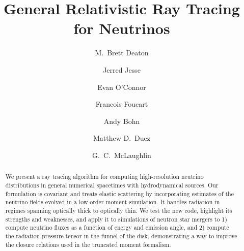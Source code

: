 \documentclass[aps,prd,twocolumn,superscriptaddress,groupedaddress]{revtex4}
\begin{document}
\widetext
{}

\title{General Relativistic Ray Tracing for Neutrinos}

\author{M.\ Brett Deaton}

\author{Jerred Jesse}

\author{Evan O'Connor}

\author{Francois Foucart}

\author{Andy Bohn}

\author{Matthew D.\ Duez}

\author{G.\ C.\ McLaughlin}


\begin{abstract}
  We present a ray tracing algorithm for computing high-resolution neutrino
  distributions in general numerical spacetimes with hydrodynamical sources.
  Our formulation is covariant and treats elastic scattering by incorporating
  estimates of the neutrino fields evolved in a low-order moment simulation.
  It handles radiation in regimes spanning optically thick to optically thin.
  We test the new code, highlight its strengths and weaknesses, and
  apply it to simulations of neutron star mergers to
  1) compute neutrino fluxes as a function of energy and emission angle, and
  2) compute the radiation pressure tensor in the funnel of the disk,
  demonstrating a way to improve the closure relations used in the truncated
  moment formalism.
\end{abstract}

\maketitle
\end{document}

